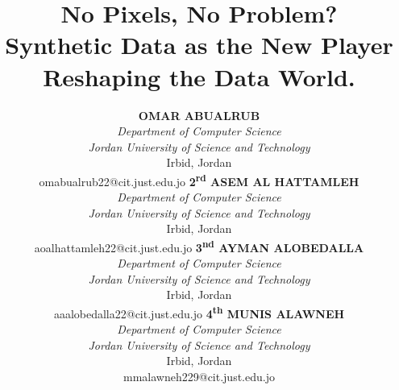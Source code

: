 \documentclass[conference]{IEEEtran}
\begin{document}


\title{\textbf{No Pixels, No Problem?}\\
\large Synthetic Data as the New Player Reshaping the Data World.}

\author{\scriptsize
\begin{tabular*}{\textwidth}{@{\extracolsep{\fill}}cccc}
\parbox[t]{0.24\textwidth}{\centering
\textbf{OMAR ABUALRUB}\\
\textit{Department of Computer Science}\\
\textit{Jordan University of Science and Technology}\\
Irbid, Jordan\\
omabualrub22@cit.just.edu.jo
}
&
\parbox[t]{0.24\textwidth}{\centering
\textbf{2\textsuperscript{rd} ASEM AL HATTAMLEH}\\
\textit{Department of Computer Science}\\
\textit{Jordan University of Science and Technology}\\
Irbid, Jordan\\
aoalhattamleh22@cit.just.edu.jo
}
&
\parbox[t]{0.24\textwidth}{\centering
\textbf{3\textsuperscript{nd} AYMAN ALOBEDALLA}\\
\textit{Department of Computer Science}\\
\textit{Jordan University of Science and Technology}\\
Irbid, Jordan\\
aaalobedalla22@cit.just.edu.jo
}
&
\parbox[t]{0.24\textwidth}{\centering
\textbf{4\textsuperscript{th} MUNIS ALAWNEH}\\
\textit{Department of Computer Science}\\
\textit{Jordan University of Science and Technology}\\
Irbid, Jordan\\
mmalawneh229@cit.just.edu.jo
}
\end{tabular*}
}


\end{document}
